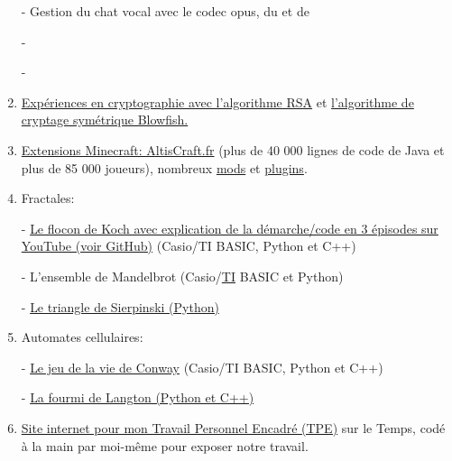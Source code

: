 \documentclass{article}
\begin{document}
\begin{enumerate}
					- Gestion du chat vocal avec le codec opus, du  et de 
				
					- 

					- 
					

				\item \href{https://github.com/Benjamin-Loison/C--projects/blob/master/main.cpp}{Expériences en cryptographie avec l'algorithme RSA} et \href{https://github.com/Benjamin-Loison/Lot-of-Java-projects/tree/master/Hash\%20password\%20database}{l'algorithme de cryptage symétrique Blowfish.}
			
				\item \href{https://github.com/Benjamin-Loison/AltisCraft.fr}{Extensions Minecraft: AltisCraft.fr} (plus de 40 000 lignes de code de Java et plus de 85 000 joueurs), nombreux \href{https://github.com/Benjamin-Loison/Lot-of-Java-projects/blob/master/Minecraft\%20mods\%20and\%20plugins.zip}{mods} et \href{https://github.com/Benjamin-Loison/Azziz-Plugin-MC-Mini-Games}{plugins}.
			
				\item Fractales:
			
				- \href{https://github.com/Benjamin-Loison/Koch-snowflake}{Le flocon de Koch avec explication de la démarche/code en 3 épisodes sur YouTube (voir GitHub)} (Casio/TI BASIC, Python et C++)
			
				- L'ensemble de Mandelbrot (Casio/\href{https://github.com/Benjamin-Loison/BASIC-algorithms-calculators-/tree/master/MANDELBR}{TI} BASIC et Python)
				
				- \href{https://github.com/Benjamin-Loison/Sierpinski-s-triangle}{Le triangle de Sierpinski (Python)}
			
				\item Automates cellulaires:
			
				- \href{https://github.com/Benjamin-Loison/Conway-game-of-life}{Le jeu de la vie de Conway} (Casio/TI BASIC, Python et C++)
			
				- \href{https://github.com/Benjamin-Loison/Langton-s-ant}{La fourmi de Langton (Python et C++)}
			
				\item \href{https://github.com/Benjamin-Loison/Travaux-Personnel-Encadr-s-TPE---BAC-}{Site internet pour mon Travail Personnel Encadré (TPE)} sur le Temps, codé à la main par moi-même pour exposer notre travail.

		\end{enumerate}
\end{document}
